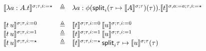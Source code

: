\documentclass{article}
\newcommand{\defeq}{\triangleq}
\begin{document}
$$\begin{array}{lcl}
\semterm{\sigma}{\tau,i:=\star}{\lambda a:A.t} & \defeq &
  \lambda a:\phi(\incrstep{i}{\tau}{(\tau \mapsto \semtype{\sigma}{\tau}{A})}).
  \semterm{\sigma,a:=a}{\tau,i:=\star}{t}\\
\\
\semterm{\sigma}{\tau,i:=0}{t\,u} & \defeq &
  \semterm{\sigma}{\tau,i:=0}{t}\,\semterm{\sigma}{\tau,i:=0}{u}\\
\semterm{\sigma}{\tau,i:=1}{t\,u} & \defeq &
  \semterm{\sigma}{\tau,i:=1}{t}\,\semterm{\sigma}{\tau,i:=1}{u}\\
\semterm{\sigma}{\tau,i:=\star}{t\,u} & \defeq &
  \semterm{\sigma}{\tau,i:=\star}{t}\,\incrstep{i}{\tau}{\tau \mapsto \semterm{\sigma}{\tau}{u}}\\
\\
\end{array}
$$
\fi



\end{document}
